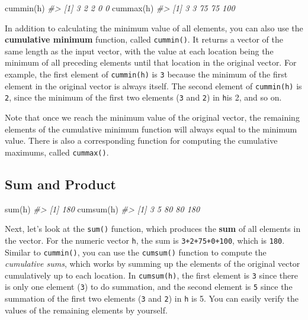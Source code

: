 \documentclass[
]{book}
\newenvironment{Shaded}{\begin{snugshade}}{\end{snugshade}}
\newcommand{\CommentTok}[1]{\textcolor[rgb]{0.56,0.35,0.01}{\textit{#1}}}
\newcommand{\FunctionTok}[1]{\textcolor[rgb]{0.00,0.00,0.00}{#1}}
\newcommand{\NormalTok}[1]{#1}
\begin{document}
\begin{Shaded}
\begin{Highlighting}[]
\FunctionTok{cummin}\NormalTok{(h) }
\CommentTok{\#\textgreater{} [1] 3 2 2 0 0}
\FunctionTok{cummax}\NormalTok{(h) }
\CommentTok{\#\textgreater{} [1]   3   3  75  75 100}
\end{Highlighting}
\end{Shaded}

In addition to calculating the minimum value of all elements, you can also use the \textbf{cumulative minimum} function, called \texttt{cummin()}. It returns a vector of the same length as the input vector, with the value at each location being the minimum of all preceding elements until that location in the original vector. For example, the first element of \texttt{cummin(h)} is \texttt{3} because the minimum of the first element in the original vector is always itself. The second element of \texttt{cummin(h)} is \texttt{2}, since the minimum of the first two elements (\texttt{3} and \texttt{2}) in \texttt{h}is 2, and so on.

Note that once we reach the minimum value of the original vector, the remaining elements of the cumulative minimum function will always equal to the minimum value. There is also a corresponding function for computing the cumulative maximums, called \texttt{cummax()}.

\hypertarget{sum-and-product}{%
\subsection{Sum and Product}\label{sum-and-product}}

\begin{Shaded}
\begin{Highlighting}[]
\FunctionTok{sum}\NormalTok{(h)}
\CommentTok{\#\textgreater{} [1] 180}
\FunctionTok{cumsum}\NormalTok{(h)}
\CommentTok{\#\textgreater{} [1]   3   5  80  80 180}
\end{Highlighting}
\end{Shaded}

Next, let's look at the \texttt{sum()} function, which produces the \textbf{sum} of all elements in the vector. For the numeric vector \texttt{h}, the sum is \texttt{3+2+75+0+100}, which is \texttt{180}. Similar to \texttt{cummin()}, you can use the \texttt{cumsum()} function to compute the \emph{cumulative sums}, which works by summing up the elements of the original vector cumulatively up to each location. In \texttt{cumsum(h)}, the first element is \texttt{3} since there is only one element (\texttt{3}) to do summation, and the second element is \texttt{5} since the summation of the first two elements (\texttt{3} and \texttt{2}) in \texttt{h} is 5. You can easily verify the values of the remaining elements by yourself.
\end{document}
